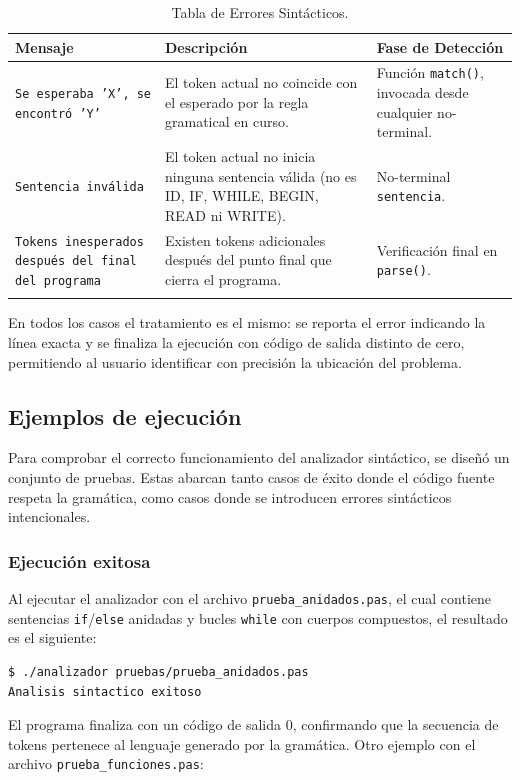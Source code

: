 \documentclass[12pt]{article}
\begin{document}
\begin{longtable}{|p{5.5cm}|p{5cm}|p{4.5cm}|}
\hline
\textbf{Mensaje} & \textbf{Descripción} & \textbf{Fase de Detección} \\
\hline
\endhead
\texttt{Se esperaba 'X', se encontró 'Y'} & El token actual no coincide con el esperado por la regla gramatical en curso. & Función \texttt{match()}, invocada desde cualquier no-terminal. \\
\hline
\texttt{Sentencia inválida} & El token actual no inicia ninguna sentencia válida (no es ID, IF, WHILE, BEGIN, READ ni WRITE). & No-terminal \texttt{sentencia}. \\
\hline
\texttt{Tokens inesperados después del final del programa} & Existen tokens adicionales después del punto final que cierra el programa. & Verificación final en \texttt{parse()}. \\
\hline
\caption{Tabla de Errores Sintácticos.}
\label{tab:errores-sintacticos}
\end{longtable}

En todos los casos el tratamiento es el mismo: se reporta el error indicando la línea exacta y se finaliza la ejecución con código de salida distinto de cero, permitiendo al usuario identificar con precisión la ubicación del problema.

\subsection{Ejemplos de ejecución}

Para comprobar el correcto funcionamiento del analizador sintáctico, se diseñó un conjunto de pruebas. Estas abarcan tanto casos de éxito donde el código fuente respeta la gramática, como casos donde se introducen errores sintácticos intencionales.

\subsubsection*{Ejecución exitosa}
Al ejecutar el analizador con el archivo \texttt{prueba\_anidados.pas}, el cual contiene sentencias \texttt{if}/\texttt{else} anidadas y bucles \texttt{while} con cuerpos compuestos, el resultado es el siguiente:

\begin{lstlisting}[frame=single, basicstyle=\ttfamily\small]
$ ./analizador pruebas/prueba_anidados.pas
Analisis sintactico exitoso
\end{lstlisting}
El programa finaliza con un código de salida 0, confirmando que la secuencia de tokens pertenece al lenguaje generado por la gramática. Otro ejemplo con el archivo \texttt{prueba\_funciones.pas}:
\end{document}
